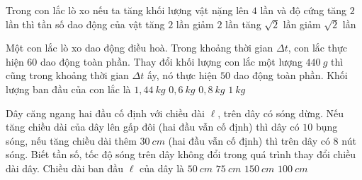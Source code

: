 	\begin{ex} %
		Trong con lắc lò xo nếu ta tăng khối lượng vật nặng lên $4$ lần và độ cứng tăng $2$ lần thì tần số dao động của vật
		\choice
		{tăng $2$ lần}
		{giảm $2$ lần}
		{tăng $\sqrt{2}$ lần}
		{\True giảm $\sqrt{2}$ lần}
	\end{ex}
	\begin{ex}%
		Một con lắc lò xo dao động điều hoà. Trong khoảng thời gian  $\Delta t$, con lắc thực hiện $60$ dao động toàn phần. Thay đổi khối lượng con lắc một lượng $440\ g$ thì cũng trong khoảng thời gian $\Delta t$ ấy, nó thực hiện $50$ dao động toàn phần. Khối lượng ban đầu của con lắc là
		\choice
		{$1,44\ kg$}
		{$0,6\ kg$}
		{$0,8\ kg$}
		{\True $1\ kg$}
	\end{ex}
	
	\begin{ex}%
		Dây căng ngang hai đầu cố định với chiều dài $\ell $, trên dây có sóng dừng. Nếu tăng chiều dài của dây lên gấp đôi (hai đầu vẫn cố định) thì dây có $10$ bụng sóng, nếu tăng chiều dài thêm $30\ cm$ (hai đầu vẫn cố định) thì trên dây có $8$ nút sóng. Biết tần số, tốc độ sóng trên dây không đổi trong quá trình thay đổi chiều dài dây. Chiều dài ban đầu $\ell$ của dây là
		\choice
		{$50\ cm$}
		{\True $75\ cm$}
		{$150\ cm$}
		{$100\ cm$}
	\end{ex}
	
